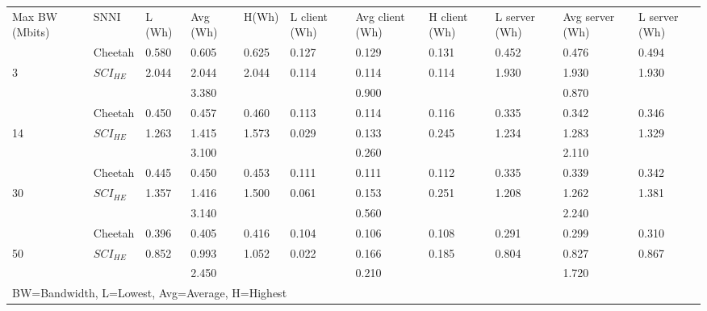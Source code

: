 \begin{tabular}{lllllllllll}
Max BW (Mbits) & SNNI    & L (Wh) & Avg (Wh) & H(Wh) & L client (Wh) & Avg client (Wh) & H client (Wh) & L server (Wh) & Avg server (Wh) & L server (Wh) \\
               & Cheetah & 0.580  & 0.605    & 0.625 & 0.127         & 0.129           & 0.131         & 0.452         & 0.476           & 0.494         \\
3              & $SCI_{HE}$ & 2.044  & 2.044    & 2.044 & 0.114         & 0.114           & 0.114         & 1.930         & 1.930           & 1.930         \\
               &         &        & 3.380    &       &               & 0.900           &               &               & 0.870           &               \\
               & Cheetah & 0.450  & 0.457    & 0.460 & 0.113         & 0.114           & 0.116         & 0.335         & 0.342           & 0.346         \\
14             & $SCI_{HE}$ & 1.263  & 1.415    & 1.573 & 0.029         & 0.133           & 0.245         & 1.234         & 1.283           & 1.329         \\
               &         &        & 3.100    &       &               & 0.260           &               &               & 2.110           &               \\
               & Cheetah & 0.445  & 0.450    & 0.453 & 0.111         & 0.111           & 0.112         & 0.335         & 0.339           & 0.342         \\
30             & $SCI_{HE}$ & 1.357  & 1.416    & 1.500 & 0.061         & 0.153           & 0.251         & 1.208         & 1.262           & 1.381         \\
               &         &        & 3.140    &       &               & 0.560           &               &               & 2.240           &               \\
               & Cheetah & 0.396  & 0.405    & 0.416 & 0.104         & 0.106           & 0.108         & 0.291         & 0.299           & 0.310         \\
50             & $SCI_{HE}$ & 0.852  & 0.993    & 1.052 & 0.022         & 0.166           & 0.185         & 0.804         & 0.827           & 0.867         \\
               &         &        & 2.450    &       &               & 0.210           &               &               & 1.720           &               \\
\multicolumn{11}{l}{BW=Bandwidth, L=Lowest, Avg=Average, H=Highest}                                                                                     
\end{tabular}